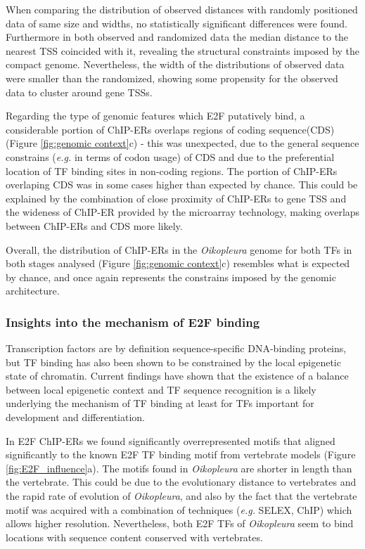 \documentclass[11pt,twoside,a4paper]{report}
\begin{document}
		When comparing the distribution of observed distances with randomly positioned data of same size and widths, no statistically significant differences were found. Furthermore in both observed and randomized data the median distance to the nearest TSS coincided with it, revealing the structural constraints imposed by the compact genome. Nevertheless, the width of the distributions of observed data were smaller than the randomized, showing some propensity for the observed data to cluster around gene TSSs.
		
		Regarding the type of genomic features which E2F putatively bind, a considerable portion of ChIP-ERs overlaps regions of coding sequence(CDS) (Figure \ref{fig:genomic context}c) - this was unexpected, due to the general sequence constrains (\textit{e.g.} in terms of codon usage) of CDS and due to the preferential location of TF binding sites in non-coding regions. The portion of ChIP-ERs overlaping CDS was in some cases higher than expected by chance. This could be explained  by the combination of close proximity of ChIP-ERs to gene TSS and the wideness of ChIP-ER provided by the microarray technology, making overlaps between ChIP-ERs and CDS more likely.
		
		Overall, the distribution of ChIP-ERs in the \textit{Oikopleura} genome for both TFs in both stages analysed (Figure \ref{fig:genomic context}c) resembles what is expected by chance, and once again represents the constrains imposed by the genomic architecture.

		\subsubsection{Insights into the mechanism of E2F binding}
		
		Transcription factors are by definition sequence-specific DNA-binding proteins, but TF binding has also been shown to be constrained by the local epigenetic state of chromatin. Current findings have shown that the existence of a balance between local epigenetic context and TF sequence recognition is a likely underlying the mechanism of TF binding at least for TFs important for development and differentiation.
		
		In E2F ChIP-ERs we found significantly overrepresented motifs that aligned significantly to the known E2F TF binding motif from vertebrate models (Figure \ref{fig:E2F_influence}a). The motifs found in \textit{Oikopleura} are shorter in length than the vertebrate. This could be due to the evolutionary distance to vertebrates and the rapid rate of evolution of \textit{Oikopleura}, and also by the fact that the vertebrate motif was acquired with a combination of techniques (\textit{e.g.} SELEX, ChIP) which allows higher resolution. Nevertheless, both E2F TFs of \textit{Oikopleura} seem to bind locations with sequence content conserved with vertebrates.
		
\end{document}
